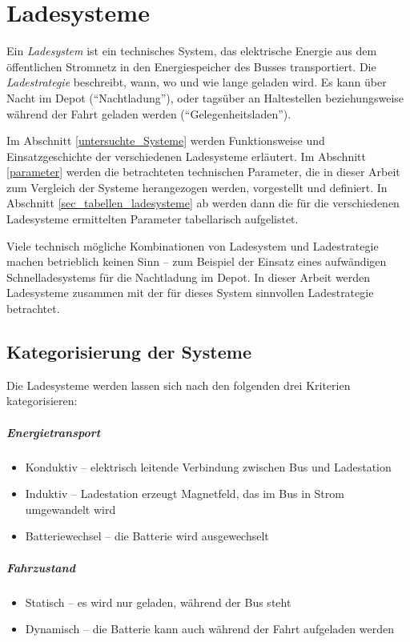 \chapter{Ladesysteme}
Ein \emph{Ladesystem} ist ein technisches System, das elektrische Energie aus dem öffentlichen Stromnetz in den Energiespeicher des Busses transportiert. Die \emph{Ladestrategie} beschreibt, wann, wo und wie lange geladen wird. Es kann über Nacht im Depot ("`Nachtladung"'), oder tagsüber an Haltestellen beziehungsweise während der Fahrt geladen werden ("`Gelegenheitsladen"').

Im  Abschnitt \ref{untersuchte_Systeme} werden Funktionsweise und Einsatzgeschichte der verschiedenen Ladesysteme erläutert. Im Abschnitt \ref{parameter} werden die betrachteten technischen Parameter, die in dieser Arbeit zum Vergleich der Systeme herangezogen werden, vorgestellt und definiert. In Abschnitt \ref{sec_tabellen_ladesysteme} ab werden dann die für die verschiedenen Ladesysteme ermittelten Parameter tabellarisch aufgelistet. 

Viele technisch mögliche Kombinationen von Ladesystem und Ladestrategie machen betrieblich keinen Sinn – zum Beispiel der Einsatz eines aufwändigen Schnelladesystems für die Nachtladung im Depot. In dieser Arbeit werden Ladesysteme zusammen mit der für dieses System sinnvollen Ladestrategie betrachtet.

\section{Kategorisierung der Systeme}
Die Ladesysteme werden lassen sich nach den folgenden drei Kriterien kategorisieren:

\paragraph{Energietransport}
\begin{itemize}
	\item Konduktiv – elektrisch leitende Verbindung zwischen Bus und Ladestation
	\item Induktiv – Ladestation erzeugt Magnetfeld, das im Bus in Strom umgewandelt wird
	\item Batteriewechsel – die Batterie wird ausgewechselt
\end{itemize}

\paragraph{Fahrzustand}
\begin{itemize}
	\item Statisch – es wird nur geladen, während der Bus steht
	\item Dynamisch – die Batterie kann auch während der Fahrt aufgeladen werden
\end{itemize}

